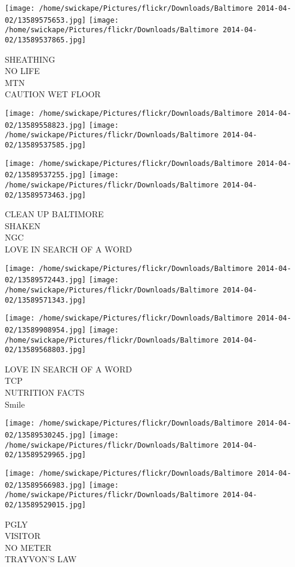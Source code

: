 \documentclass[10pt,letterpaper]{article}
\begin{document}
\texttt{[image: /home/swickape/Pictures/flickr/Downloads/Baltimore 2014-04-02/13589575653.jpg]}
\texttt{[image: /home/swickape/Pictures/flickr/Downloads/Baltimore 2014-04-02/13589537865.jpg]}

SHEATHING\\
NO LIFE\\
MTN\\
CAUTION WET FLOOR
\pagebreak

\texttt{[image: /home/swickape/Pictures/flickr/Downloads/Baltimore 2014-04-02/13589558823.jpg]}
\texttt{[image: /home/swickape/Pictures/flickr/Downloads/Baltimore 2014-04-02/13589537585.jpg]}

\texttt{[image: /home/swickape/Pictures/flickr/Downloads/Baltimore 2014-04-02/13589537255.jpg]}
\texttt{[image: /home/swickape/Pictures/flickr/Downloads/Baltimore 2014-04-02/13589573463.jpg]}

CLEAN UP BALTIMORE\\
SHAKEN\\
NGC\\
LOVE IN SEARCH OF A WORD
\pagebreak

\texttt{[image: /home/swickape/Pictures/flickr/Downloads/Baltimore 2014-04-02/13589572443.jpg]}
\texttt{[image: /home/swickape/Pictures/flickr/Downloads/Baltimore 2014-04-02/13589571343.jpg]}

\texttt{[image: /home/swickape/Pictures/flickr/Downloads/Baltimore 2014-04-02/13589908954.jpg]}
\texttt{[image: /home/swickape/Pictures/flickr/Downloads/Baltimore 2014-04-02/13589568803.jpg]}

LOVE IN SEARCH OF A WORD\\
TCP\\
NUTRITION FACTS\\
Smile
\pagebreak

\texttt{[image: /home/swickape/Pictures/flickr/Downloads/Baltimore 2014-04-02/13589530245.jpg]}
\texttt{[image: /home/swickape/Pictures/flickr/Downloads/Baltimore 2014-04-02/13589529965.jpg]}

\texttt{[image: /home/swickape/Pictures/flickr/Downloads/Baltimore 2014-04-02/13589566983.jpg]}
\texttt{[image: /home/swickape/Pictures/flickr/Downloads/Baltimore 2014-04-02/13589529015.jpg]}

PGLY\\
VISITOR\\
NO METER\\
TRAYVON'S LAW
\pagebreak
\end{document}
